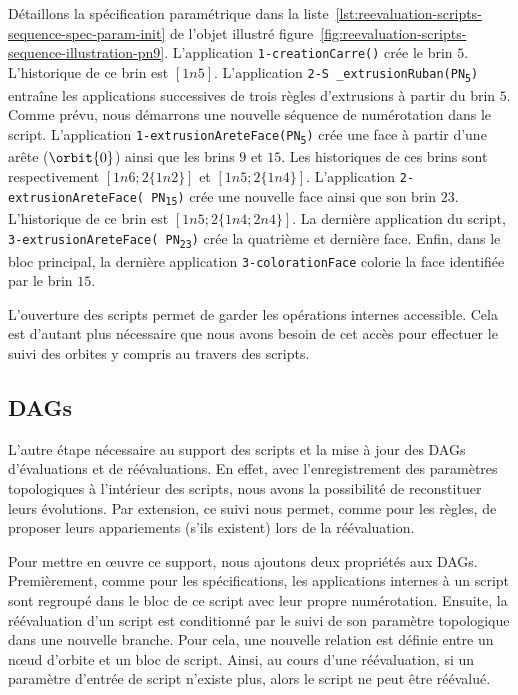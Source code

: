 Détaillons la spécification paramétrique dans la
liste~\ref{lst:reevaluation-scripts-sequence-spec-param-init} de l'objet
illustré figure~\ref{fig:reevaluation-scripts-sequence-illustration-pn9}. %
L'application \texttt{1\allowbreak{}-\allowbreak{}creation\-Carre()} crée le
brin \(5\). %
L'historique de ce brin est \([1n5]\). %
L'application \texttt{2\allowbreak{}\allowbreak{}-S\allowbreak{}%
  \_\allowbreak{}extrusion\-Ruban(PN\textsubscript{5})} entraîne les
applications successives de trois règles d'extrusions à partir du brin \(5\). %
Comme prévu, nous démarrons une nouvelle séquence de numérotation dans le
script. %
L'application
\texttt{1\allowbreak{}-\allowbreak{}extrusion\-Arete\-Face(PN\textsubscript{5})}
crée une face à partir d'une arête (\(\orbit{0}\)) ainsi que les brins \(9\) et
\(15\). %
Les historiques de ces brins sont respectivement \([1n6;2\{1n2\}]\) et
\([1n5;2\{1n4\}]\). %
L'application \texttt{2\allowbreak{}-\allowbreak{}extrusion\-Arete\-Face(%
  PN\textsubscript{15})} crée une nouvelle face ainsi que son brin \(23\). %
L'historique de ce brin est \([1n5;2\{1n4;2n4\}]\). %
La dernière application du script,
\texttt{3\allowbreak{}-\allowbreak{}extrusion\-Arete\-Face(%
  PN\textsubscript{23})} crée la quatrième et dernière face. %
Enfin, dans le bloc principal, la dernière application
\texttt{3\allowbreak{}-\allowbreak{}coloration\-Face} colorie la face identifiée
par le brin \(15\). %


L'ouverture des scripts permet de garder les opérations internes accessible. %
Cela est d'autant plus nécessaire que nous avons besoin de cet accès pour
effectuer le suivi des orbites y compris au travers des scripts. %

\subsection{DAGs}
\label{sec:reevaluation-scripts-sequence-extension-dags}


L'autre étape nécessaire au support des scripts et la mise à jour des DAGs
d'évaluations et de réévaluations. %
En effet, avec l'enregistrement des paramètres topologiques à l'intérieur des
scripts, nous avons la possibilité de reconstituer leurs évolutions. %
Par extension, ce suivi nous permet, comme pour les règles, de proposer leurs
appariements (s'ils existent) lors de la réévaluation. %

Pour mettre en \oe uvre ce support, nous ajoutons deux propriétés aux DAGs. %
Premièrement, comme pour les spécifications, les applications internes à un
script sont regroupé dans le bloc de ce script avec leur propre numérotation. %
Ensuite, la réévaluation d'un script est conditionné par le suivi de son
paramètre topologique dans une nouvelle branche. %
Pour cela, une nouvelle relation est définie entre un n\oe ud d'orbite et un
bloc de script. %
Ainsi, au cours d'une réévaluation, si un paramètre d'entrée de script n’existe
plus, alors le script ne peut être réévalué. %

